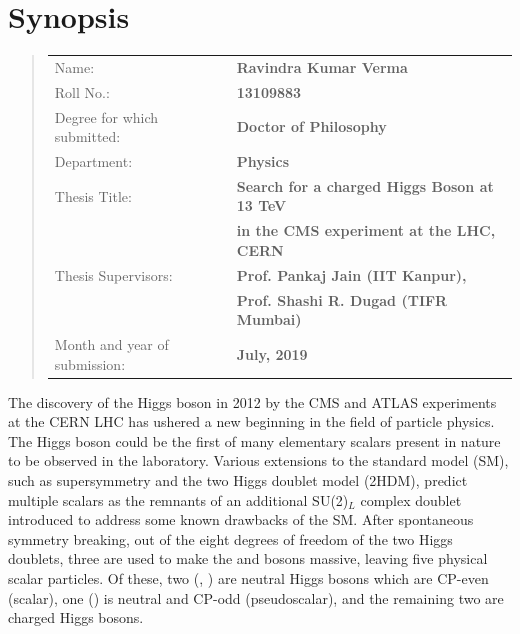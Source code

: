 \chapter{Synopsis}
\bigskip
\begin{quote}
\begin{tabular}[c]{ll}
Name: & {\textbf {Ravindra Kumar Verma}}\\
Roll No.: & {\textbf{ 13109883}}\\
Degree for which submitted: &  {\textbf{ Doctor of Philosophy}}\\
Department: & {\textbf{ Physics}}\\
Thesis Title: & {\textbf{ Search for a charged Higgs Boson at 13 TeV }}\\
 {}& {\textbf{ in the CMS experiment at the LHC, CERN}}\\
Thesis Supervisors: & {\textbf{ Prof. Pankaj Jain (IIT Kanpur),}}\\ 
{}&{\textbf{ Prof. Shashi R. Dugad (TIFR Mumbai)}}\\ 
Month and year of submission: & {\textbf{ July, 2019}} 
\end{tabular}
\end{quote}
\hrulefill
\bigskip

The discovery of the Higgs boson in 2012 by the CMS and ATLAS experiments at 
the CERN LHC has ushered a new beginning in the field of particle physics. 
The Higgs boson could be the first of many elementary scalars present in 
nature to be observed in the laboratory. Various extensions to the standard 
model (SM), such as supersymmetry and the two Higgs doublet model (2HDM), 
predict multiple scalars as the remnants of an additional SU(2)$_L$ complex 
doublet introduced to address some known drawbacks of the SM. After spontaneous 
symmetry breaking, out of the eight degrees of freedom of the two Higgs doublets, 
three are used to make the \PW and \PZ bosons massive, leaving five physical scalar
particles. Of these, two (\Ph, \PH) are neutral Higgs bosons which are
CP-even (scalar), one (\PSA) is neutral and CP-odd (pseudoscalar), and the
remaining two are charged Higgs \PHpm bosons.

